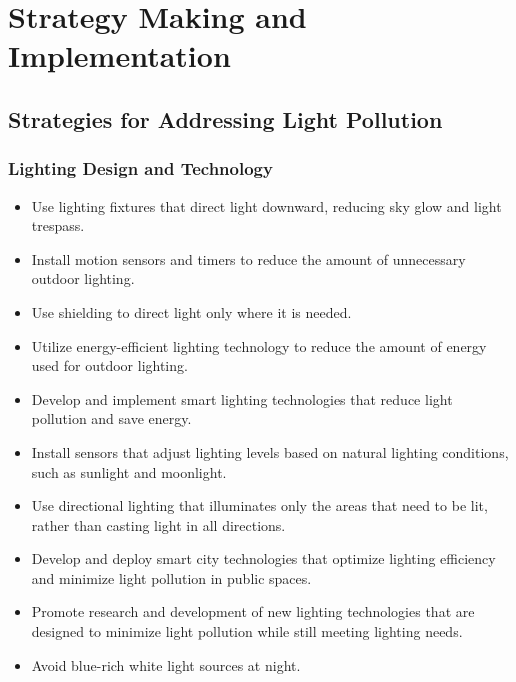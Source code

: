 \MinParskip{}

\section{Strategy Making and Implementation}



\subsection{Strategies for Addressing Light Pollution}

\subsubsection{Lighting Design and Technology}
\begin{itemize}
    \item Use lighting fixtures that direct light downward, reducing sky glow and light trespass.
    
    \item Install motion sensors and timers to reduce the amount of unnecessary outdoor lighting.
    
    \item Use shielding to direct light only where it is needed.
    
    \item Utilize energy-efficient lighting technology to reduce the amount of energy used for outdoor lighting.

    \item Develop and implement smart lighting technologies that reduce light pollution and save energy.
    
    \item Install sensors that adjust lighting levels based on natural lighting conditions, such as sunlight and moonlight.
    
    \item Use directional lighting that illuminates only the areas that need to be lit, rather than casting light in all directions.
    
    \item Develop and deploy smart city technologies that optimize lighting efficiency and minimize light pollution in public spaces.
    
    \item Promote research and development of new lighting technologies that are designed to minimize light pollution while still meeting lighting needs.

    \item Avoid blue-rich white light sources at night. 

\end{itemize}

